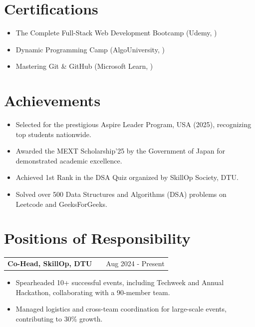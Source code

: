 \documentclass[a4paper,10pt]{article}
\makeatletter
\newenvironment{joblong}[2]
    {
    \begin{tabularx}{\linewidth}{@{}l X r@{}}
    \textbf{#1} & \hfill &  #2 \\[3.75pt]
    \end{tabularx}
    \begin{minipage}[t]{\linewidth}
    \begin{itemize}[nosep,after=\strut, leftmargin=1em, itemsep=3pt,label=--]
    }
    {
    \end{itemize}
    \end{minipage}    
    }
\makeatother
\begin{document}
\section{Certifications}

\begin{itemize}[nosep,leftmargin=1.2em]
\item The Complete Full-Stack Web Development Bootcamp (Udemy, )
\item Dynamic Programming Camp (AlgoUniversity, )
\item Mastering Git \& GitHub (Microsoft Learn, )
\end{itemize}

\section{Achievements}

\begin{itemize}[nosep,leftmargin=1.2em]
\item Selected for the prestigious Aspire Leader Program, USA (2025), recognizing top students nationwide.
\item Awarded the MEXT Scholarship’25 by the Government of Japan for demonstrated academic excellence.
\item Achieved 1st Rank in the DSA Quiz organized by SkillOp Society, DTU.
\item Solved over 500 Data Structures and Algorithms (DSA) problems on Leetcode and GeeksForGeeks.
\end{itemize}

\section{Positions of Responsibility}


\begin{joblong}{Co-Head, SkillOp, DTU}{Aug 2024 - Present}
\item Spearheaded 10+ successful events, including Techweek and Annual Hackathon, collaborating with a 90-member team.
\item Managed logistics and cross-team coordination for large-scale events, contributing to 30\% growth.
\end{joblong}
\vspace{3pt}




\vfill
{}
\end{document}
